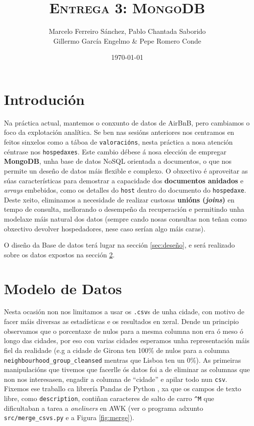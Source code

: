 \documentclass[12pt,a4paper]{article}
\title{\textsc{Entrega 3: MongoDB}}
\author{Marcelo Ferreiro Sánchez, Pablo Chantada Saborido\\  Gillermo García Engelmo \& Pepe Romero Conde}
\date{\today}
\begin{document}
\maketitle

\tableofcontents

\newpage

\section{Introdución}

Na práctica actual, mantemos o conxunto de datos de AirBnB, pero cambiamos o
foco da explotación analítica. Se ben nas sesións anteriores nos centramos en
feitos sinxelos como a táboa de \texttt{valoracións}, nesta práctica a nosa
atención céntrase nos \texttt{hospedaxes}. Este cambio débese á nosa elección de
empregar \textbf{MongoDB}, unha base de datos NoSQL orientada a documentos, o
que nos permite un deseño de datos máis flexible e complexo. O obxectivo é
aproveitar as súas características para demostrar a capacidade dos
\textbf{documentos anidados} e \emph{arrays} embebidos, como os detalles do
\texttt{host} dentro do documento do \texttt{hospedaxe}. Deste xeito, eliminamos
a necesidade de realizar custosas \textbf{unións (\emph{joins})} en tempo de
consulta, mellorando o desempeño da recuperación e permitindo unha modelaxe máis
natural dos datos (sempre cando nosas consultas non teñan como obxectivo
devolver hospedadores, nese caso serían algo máis caras).

O diseño da Base
de datos terá lugar na sección \ref{sec:deseño}, e será realizado sobre os datos
expostos na sección \ref{sec:modeloDatos}.

\section{Modelo de Datos}
\label{sec:modeloDatos}

Nesta ocasión non nos limitamos a usar os \texttt{.csv}s de unha cidade, con motivo de facer máis diversas as estadísticas e os resultados en xeral. Dende un principio observamos que o porcentaxe de nulos para a mesma columna non era ó meso ó longo das cidades, por eso con varias cidades esperamos unha representación máis fiel da realidade (e.g a cidade de Girona ten 100\% de nulos para a columna \texttt{neighbourhood\_group\_cleansed} mentras que Lisboa ten un 0\%). As primeiras manipulacións que  tivemos que facerlle ós datos foi a de eliminar as columnas que non nos interesasen, engadir a columna de ``cidade'' e apilar todo nun \texttt{csv}. Fixemos ese traballo ca librería Pandas \cite{pandas_license} de Python \cite{cpython_license}, xa que os campos de texto libre, como \texttt{description}, contiñan caracteres de salto de carro \texttt{\^{}M} que dificultaban a tarea a \emph{oneliners} en AWK \cite{gpl3_license}  (ver o programa adxunto \texttt{src/merge\_csvs.py} e a Figura \ref{fig:merge}).  
\end{document}
